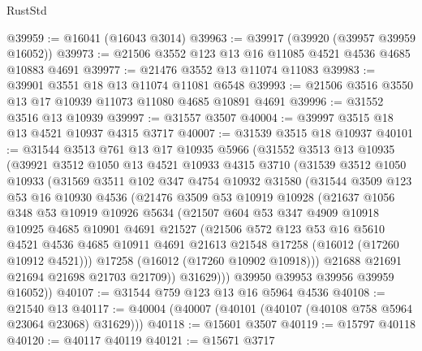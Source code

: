 \begin{lexlean}{RustStd}
\begin{coremodule}
@39959 := @16041 (@16043 @3014)
@39963 := @39917 (@39920 (@39957 @39959 @16052))
@39973 := @21506 @3552 @123 @13 @16 @11085 @4521 @4536 @4685 @10883 @4691
@39977 := @21476 @3552 @13 @11074 @11083
@39983 := @39901 @3551 @18 @13 @11074 @11081 @6548
@39993 := @21506 @3516 @3550 @13 @17 @10939 @11073 @11080 @4685 @10891 @4691
@39996 := @31552 @3516 @13 @10939
@39997 := @31557 @3507
@40004 := @39997 @3515 @18 @13 @4521 @10937 @4315 @3717
@40007 := @31539 @3515 @18 @10937
@40101 := @31544
    @3513
    @761
    @13
    @17
    @10935
    @5966
    (@31552
      @3513
      @13
      @10935
      (@39921
        @3512
        @1050
        @13
        @4521
        @10933
        @4315
        @3710
        (@31539
          @3512
          @1050
          @10933
          (@31569
            @3511
            @102
            @347
            @4754
            @10932
            @31580
            (@31544
              @3509
              @123
              @53
              @16
              @10930
              @4536
              (@21476
                @3509
                @53
                @10919
                @10928
                (@21637
                  @1056
                  @348
                  @53
                  @10919
                  @10926
                  @5634
                  (@21507
                    @604
                    @53
                    @347
                    @4909
                    @10918
                    @10925
                    @4685
                    @10901
                    @4691
                    @21527
                    (@21506
                      @572
                      @123
                      @53
                      @16
                      @5610
                      @4521
                      @4536
                      @4685
                      @10911
                      @4691
                      @21613
                      @21548
                      @17258
                      (@16012 (@17260 @10912 @4521)))
                    @17258
                    (@16012 (@17260 @10902 @10918)))
                  @21688
                  @21691
                  @21694
                  @21698
                  @21703
                  @21709))
              @31629)))
        @39950
        @39953
        @39956
        @39959
        @16052))
@40107 := @31544 @759 @123 @13 @16 @5964 @4536
@40108 := @21540 @13
@40117 := @40004 (@40007 (@40101 (@40107 (@40108 @758 @5964 @23064 @23068) @31629)))
@40118 := @15601 @3507
@40119 := @15797 @40118
@40120 := @40117 @40119
@40121 := @15671 @3717

\end{coremodule}
\end{lexlean}
